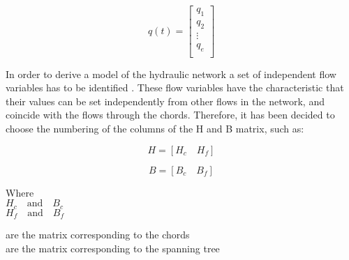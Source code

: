 \begin{minipage}{0.45\linewidth}
 \begin{equation}
q(t) =
\begin{bmatrix}
         q_1 \\
	q_2 \\ 
	\vdots \\
	q_e \\
\end{bmatrix}
\end{equation}
\end{minipage}

 
In order to derive a model of the hydraulic network a set of independent flow variables has to be identified \cite{TowerModel}. These flow variables have the characteristic 
that their values can be set independently from other flows in the network, and coincide with the flows through the chords. 
Therefore, it has been decided to choose the numbering of the columns of the 
H and B matrix, such as:

\begin{minipage}{0.45\textwidth}
\begin{equation}
H = [H_c \quad H_f]
\end{equation}   \nonumber
\end{minipage}

\begin{minipage}{0.45\textwidth}
\begin{equation}
B = [B_c  \quad B_f]
\end{equation}
\end{minipage}


\begin{minipage}[t]{0.20\textwidth}
Where\\
\hspace*{8mm} $H_c \quad \text{and} \quad B_c$ \\
\hspace*{8mm} $H_f \quad \text{and} \quad B_f$ 
\end{minipage}
\begin{minipage}[t]{0.68\textwidth}
\vspace*{2mm}
\hspace*{8mm} are the matrix corresponding to the chords\\
\hspace*{8mm} are the matrix corresponding to the spanning tree 
\end{minipage}

